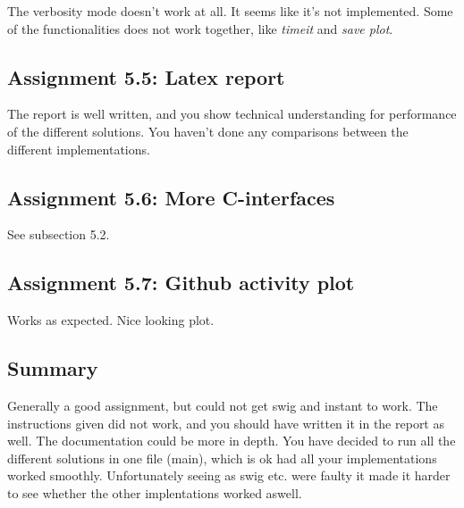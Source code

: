 \documentclass[a4paper]{article}
\begin{document}
The verbosity mode doesn't work at all. It seems like it's not implemented. Some of the functionalities does not work together, like \emph{timeit} and \emph{save plot}.

\subsection*{Assignment 5.5: Latex report}
The report is well written, and you show technical understanding for performance of the different solutions. You haven't done any comparisons between the different implementations.

\subsection*{Assignment 5.6: More C-interfaces}
See subsection 5.2. 

\subsection*{Assignment 5.7: Github activity plot}
Works as expected. Nice looking plot. 

\subsection*{Summary}
Generally a good assignment, but could not get swig and instant to work. The instructions given did not work, and you should have written it in the report as well. The documentation could be more in depth. You have decided to run all the different solutions in one file (main), which is ok had all your implementations worked smoothly. Unfortunately seeing as swig etc. were faulty it made it harder to see whether the other implentations worked aswell.



\end{document}
